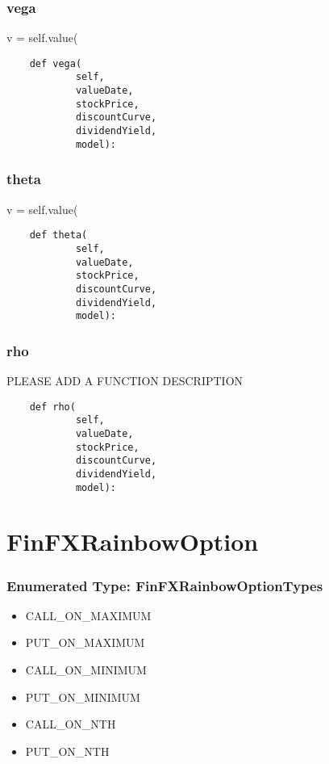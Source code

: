 \documentclass[twoside,11pt]{book}
\begin{document}
\subsubsection*{{\bf vega}}
v = self.value( 

\begin{lstlisting}
    def vega(
            self,
            valueDate,
            stockPrice,
            discountCurve,
            dividendYield,
            model):
\end{lstlisting}

\subsubsection*{{\bf theta}}
v = self.value( 

\begin{lstlisting}
    def theta(
            self,
            valueDate,
            stockPrice,
            discountCurve,
            dividendYield,
            model):
\end{lstlisting}

\subsubsection*{{\bf rho}}
PLEASE ADD A FUNCTION DESCRIPTION

\begin{lstlisting}
    def rho(
            self,
            valueDate,
            stockPrice,
            discountCurve,
            dividendYield,
            model):
\end{lstlisting}

\newpage
\section{FinFXRainbowOption}

\subsubsection{Enumerated Type: FinFXRainbowOptionTypes}
\begin{itemize}
\item{CALL\_ON\_MAXIMUM}
\item{PUT\_ON\_MAXIMUM}
\item{CALL\_ON\_MINIMUM}
\item{PUT\_ON\_MINIMUM}
\item{CALL\_ON\_NTH}
\item{PUT\_ON\_NTH}
\end{itemize}
\end{document}
